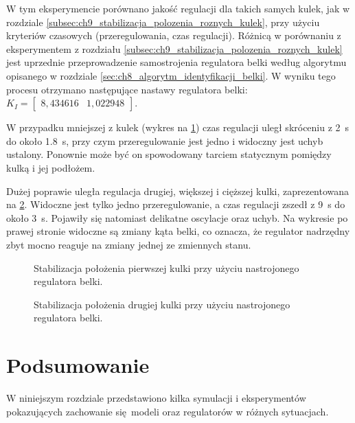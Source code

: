 W tym eksperymencie porównano jakość regulacji dla takich samych kulek, jak w rozdziale \ref{subsec:ch9_stabilizacja_polozenia_roznych_kulek}, przy użyciu kryteriów czasowych (przeregulowania, czas regulacji). Różnicą w porównaniu z eksperymentem z rozdziału \ref{subsec:ch9_stabilizacja_polozenia_roznych_kulek} jest uprzednie przeprowadzenie samostrojenia regulatora belki według algorytmu opisanego w rozdziale \ref{sec:ch8_algorytm_identyfikacji_belki}. W wyniku tego procesu otrzymano następujące nastawy regulatora belki: $K_I = \begin{bmatrix}
8,434616 & 1,022948
\end{bmatrix}$.

W przypadku mniejszej z kulek (wykres na \cref{fig:stabilizacja_kulka1_nastrojona}) czas regulacji uległ skróceniu z \SI{2}{\second} do około \SI{1.8}{\second}, przy czym przeregulowanie jest jedno i widoczny jest uchyb ustalony. Ponownie może być on spowodowany tarciem statycznym pomiędzy kulką i jej podłożem.

Dużej poprawie uległa regulacja drugiej, większej i cięższej kulki, zaprezentowana na \cref{fig:stabilizacja_kulka2_nastrojona}. Widoczne jest tylko jedno przeregulowanie, a czas regulacji zszedł z \SI{9}{\second} do około \SI{3}{\second}. Pojawiły się natomiast delikatne oscylacje oraz uchyb. Na wykresie po prawej stronie widoczne są zmiany kąta belki, co oznacza, że regulator nadrzędny zbyt mocno reaguje na zmiany jednej ze zmiennych stanu.

\begin{figure}[p]
    
    \caption{Stabilizacja położenia pierwszej kulki przy użyciu nastrojonego regulatora belki.}
    \label{fig:stabilizacja_kulka1_nastrojona}
\end{figure}
\begin{figure}[p]
    
    \caption{Stabilizacja położenia drugiej kulki przy użyciu nastrojonego regulatora belki.}
    \label{fig:stabilizacja_kulka2_nastrojona}
\end{figure}

\section{Podsumowanie}

W niniejszym rozdziale przedstawiono kilka symulacji i eksperymentów pokazujących zachowanie się modeli oraz regulatorów w różnych sytuacjach.


